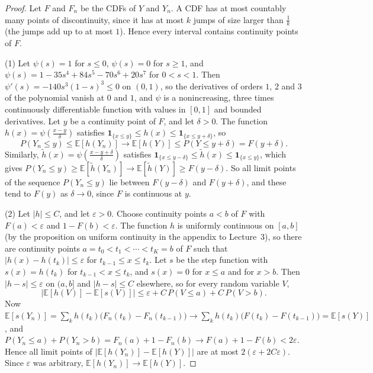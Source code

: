 \documentclass[11pt]{article}
\newcommand{\E}{\mathbb{E}}
\theoremstyle{definition}
\theoremstyle{plain}
\theoremstyle{remark}
\begin{document}
\begin{proof}
    Let $F$ and $F_n$ be the CDFs of $Y$ and $Y_n$. A CDF has at most countably many points of discontinuity, since it has at most $k$ jumps of size larger than $\frac{1}{k}$ (the jumps add up to at most $1$). Hence every interval contains continuity points of $F$.

    (1) Let $\psi(s) = 1$ for $s \leq 0$, $\psi(s) = 0$ for $s \geq 1$, and $\psi(s) = 1 - 35s^4 + 84s^5 - 70s^6 + 20s^7$ for $0 < s < 1$. Then $\psi'(s) = -140s^3(1 - s)^3 \leq 0$ on $(0, 1)$, so the derivatives of orders $1$, $2$ and $3$ of the polynomial vanish at $0$ and $1$, and $\psi$ is a nonincreasing, three times continuously differentiable function with values in $[0, 1]$ and bounded derivatives. Let $y$ be a continuity point of $F$, and let $\delta > 0$. The function $h(x) = \psi(\frac{x - y}{\delta})$ satisfies $\mathbf{1}_{\{x \leq y\}} \leq h(x) \leq \mathbf{1}_{\{x \leq y + \delta\}}$, so
    \[P(Y_n \leq y) \leq \E[h(Y_n)] \to \E[h(Y)] \leq P(Y \leq y + \delta) = F(y + \delta).\]
    Similarly, $\tilde{h}(x) = \psi(\frac{x - y + \delta}{\delta})$ satisfies $\mathbf{1}_{\{x \leq y - \delta\}} \leq \tilde{h}(x) \leq \mathbf{1}_{\{x \leq y\}}$, which gives $P(Y_n \leq y) \geq \E[\tilde{h}(Y_n)] \to \E[\tilde{h}(Y)] \geq F(y - \delta)$. So all limit points of the sequence $P(Y_n \leq y)$ lie between $F(y - \delta)$ and $F(y + \delta)$, and these tend to $F(y)$ as $\delta \to 0$, since $F$ is continuous at $y$.

    (2) Let $|h| \leq C$, and let $\varepsilon > 0$. Choose continuity points $a < b$ of $F$ with $F(a) < \varepsilon$ and $1 - F(b) < \varepsilon$. The function $h$ is uniformly continuous on $[a, b]$ (by the proposition on uniform continuity in the appendix to Lecture~3), so there are continuity points $a = t_0 < t_1 < \cdots < t_K = b$ of $F$ such that $|h(x) - h(t_k)| \leq \varepsilon$ for $t_{k-1} \leq x \leq t_k$. Let $s$ be the step function with $s(x) = h(t_k)$ for $t_{k-1} < x \leq t_k$, and $s(x) = 0$ for $x \leq a$ and for $x > b$. Then $|h - s| \leq \varepsilon$ on $(a, b]$ and $|h - s| \leq C$ elsewhere, so for every random variable $V$,
    \[\big|\E[h(V)] - \E[s(V)]\big| \leq \varepsilon + C\,P(V \leq a) + C\,P(V > b).\]
    Now $\E[s(Y_n)] = \sum_k h(t_k)\big(F_n(t_k) - F_n(t_{k-1})\big) \to \sum_k h(t_k)\big(F(t_k) - F(t_{k-1})\big) = \E[s(Y)]$, and $P(Y_n \leq a) + P(Y_n > b) = F_n(a) + 1 - F_n(b) \to F(a) + 1 - F(b) < 2\varepsilon$. Hence all limit points of $\big|\E[h(Y_n)] - \E[h(Y)]\big|$ are at most $2(\varepsilon + 2C\varepsilon)$. Since $\varepsilon$ was arbitrary, $\E[h(Y_n)] \to \E[h(Y)]$.
\end{proof}
\end{document}
